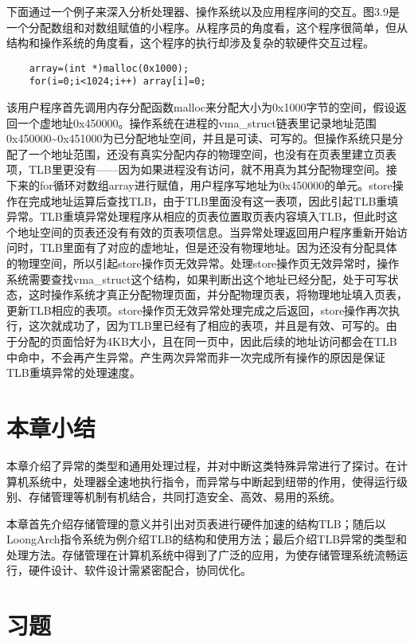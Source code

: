 \documentclass[]{ctexbook}
\begin{document}
下面通过一个例子来深入分析处理器、操作系统以及应用程序间的交互。图3.9是一个分配数组和对数组赋值的小程序。从程序员的角度看，这个程序很简单，但从结构和操作系统的角度看，这个程序的执行却涉及复杂的软硬件交互过程。

\begin{verbatim}
    array=(int *)malloc(0x1000);
    for(i=0;i<1024;i++) array[i]=0;
\end{verbatim}

该用户程序首先调用内存分配函数malloc来分配大小为0x1000字节的空间，假设返回一个虚地址0x450000。操作系统在进程的vma\_struct链表里记录地址范围0x450000\textasciitilde0x451000为已分配地址空间，并且是可读、可写的。但操作系统只是分配了一个地址范围，还没有真实分配内存的物理空间，也没有在页表里建立页表项，TLB里更没有------因为如果进程没有访问，就不用真为其分配物理空间。接下来的for循环对数组array进行赋值，用户程序写地址为0x450000的单元。store操作在完成地址运算后查找TLB，由于TLB里面没有这一表项，因此引起TLB重填异常。TLB重填异常处理程序从相应的页表位置取页表内容填入TLB，但此时这个地址空间的页表还没有有效的页表项信息。当异常处理返回用户程序重新开始访问时，TLB里面有了对应的虚地址，但是还没有物理地址。因为还没有分配具体的物理空间，所以引起store操作页无效异常。处理store操作页无效异常时，操作系统需要查找vma\_struct这个结构，如果判断出这个地址已经分配，处于可写状态，这时操作系统才真正分配物理页面，并分配物理页表，将物理地址填入页表，更新TLB相应的表项。store操作页无效异常处理完成之后返回，store操作再次执行，这次就成功了，因为TLB里已经有了相应的表项，并且是有效、可写的。由于分配的页面恰好为4KB大小，且在同一页中，因此后续的地址访问都会在TLB中命中，不会再产生异常。产生两次异常而非一次完成所有操作的原因是保证TLB重填异常的处理速度。

\hypertarget{ux672cux7ae0ux5c0fux7ed3-2}{%
\section{本章小结}\label{ux672cux7ae0ux5c0fux7ed3-2}}

本章介绍了异常的类型和通用处理过程，并对中断这类特殊异常进行了探讨。在计算机系统中，处理器全速地执行指令，而异常与中断起到纽带的作用，使得运行级别、存储管理等机制有机结合，共同打造安全、高效、易用的系统。

本章首先介绍存储管理的意义并引出对页表进行硬件加速的结构TLB；随后以LoongArch指令系统为例介绍TLB的结构和使用方法；最后介绍TLB异常的类型和处理方法。存储管理在计算机系统中得到了广泛的应用，为使存储管理系统流畅运行，硬件设计、软件设计需紧密配合，协同优化。

\hypertarget{ux4e60ux9898-2}{%
\section{习题}\label{ux4e60ux9898-2}}
\end{document}
